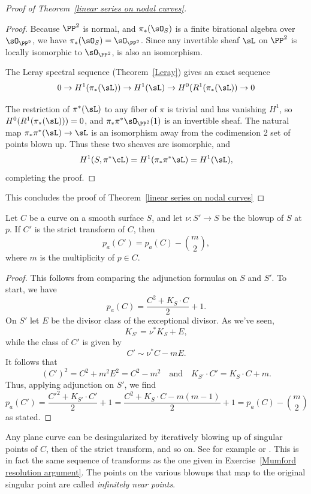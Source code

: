 \begin{proof}[Proof of Theorem~\ref{linear series on nodal curves}]
\begin{proof} Because $\PP^2$ is normal, and $\pi_*(\sO_S)$ is a finite birational algebra over $\sO_{\PP^2}$, we have $\pi_*(\sO_S) = \sO_{\PP^2}$.
Since any invertible sheaf $\sL$ on $\PP^{2}$ is locally isomorphic to $\sO_{\PP^2}$,   is also an isomorphism. 

The Leray spectral sequence (Theorem~\ref{Leray}) gives an exact sequence
$$
0\to H^{1}(\pi_{*}(\sL)) \to H^{1}(\sL) \to  H^{0}(R^{1}(\pi_{*}(\sL))\to 0
$$

 The restriction of $\pi^{*}(\sL)$ to any fiber of $\pi$ is trivial and has vanishing $H^{1}$,
so
$H^{0}(R^{1}(\pi_{*}(\sL))) = 0$, and $\pi_{*}\pi^{*}\sO_{\PP^{2}}(1)$ is an invertible sheaf.
The natural map
$\pi_{*}\pi^{*}(\sL) \to \sL$ is an isomorphism away from the codimension
2 set of points blown up. Thus these two sheaves are isomorphic, and
$$
H^1(S, \pi^*\cL) = H^{1}(\pi_{*}\pi^{*}\sL) = H^{1}(\sL),
$$
completing the proof.
\end{proof}

This concludes the proof of Theorem~\ref{linear series on nodal curves}
\end{proof}



\begin{proposition}\label{effect of blowup on genus}
 Let $C$ be a curve on a smooth surface $S$, and let $\nu : S' \to S$ be the blowup of $S$ at $p$. If $C'$ is the strict transform of $C$, then
 $$
 p_a(C') = p_a(C) -{m\choose 2},
 $$
 where $m$ is the multiplicity of $p\in C$.
\end{proposition}
\begin{proof}
This follows from comparing the adjunction formulas on $S$ and $S'$. To start, we have
$$
p_a(C) = \frac{C^2 + K_S\cdot C}{2} + 1.
$$
On $S'$ let $E$ be the divisor class of the exceptional divisor. As we've seen,
$$
K_{S'} = \nu^*K_S + E,
$$
while the class of $C'$ is given by
$$
C' \sim \nu^*C - mE.
$$
It follows that
$$
(C')^2 = C^2 + m^2E^2 = C^2 - m^2 \quad \text{and} \quad K_{S'}\cdot C' = K_S\cdot C + m.
$$
Thus, applying adjunction on $S'$, we find
$$
p_a(C') = \frac{{C'}^2 + K_{S'}\cdot C'}{2} + 1 = \frac{C^2 + K_S\cdot C - m(m-1)}{2} + 1 = p_a(C) -{m\choose 2}
$$
as stated.
\end{proof}

\begin{fact}
Any plane curve can be desingularized by
iteratively blowing up of singular points of $C$, then of the strict transform, and so on. See for example
\cite{Fulton1989} or \cite{Brieskorn1986}.  This is in fact the same
sequence of transforms as the one given in Exercise~\ref{Mumford resolution argument}. 
The points on the various blowups that
map to the original singular point are called \emph{infinitely near points}.
\end{fact}

